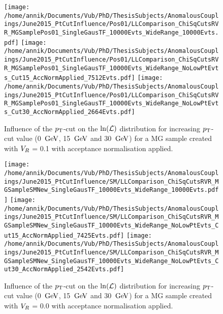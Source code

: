 \begin{figure}[h!t]
 \centering
 \texttt{[image: /home/annik/Documents/Vub/PhD/ThesisSubjects/AnomalousCouplings/June2015\_PtCutInfluence/Pos01/LLComparison\_ChiSqCutsRVR\_MGSamplePos01\_SingleGausTF\_10000Evts\_WideRange\_10000Evts.pdf]}
 \texttt{[image: /home/annik/Documents/Vub/PhD/ThesisSubjects/AnomalousCouplings/June2015\_PtCutInfluence/Pos01/LLComparison\_ChiSqCutsRVR\_MGSamplePos01\_SingleGausTF\_10000Evts\_WideRange\_NoLowPtEvts\_Cut15\_AccNormApplied\_7512Evts.pdf]}
 \texttt{[image: /home/annik/Documents/Vub/PhD/ThesisSubjects/AnomalousCouplings/June2015\_PtCutInfluence/Pos01/LLComparison\_ChiSqCutsRVR\_MGSamplePos01\_SingleGausTF\_10000Evts\_WideRange\_NoLowPtEvts\_Cut30\_AccNormApplied\_2664Evts.pdf]}
 \caption{Influence of the $p_{\textrm T}$-cut on the $\ln(\mathcal{L})$ distribution for increasing $p_{\textrm T}$-cut value (0 $\, \mathrm{GeV}$, 15 $\, \mathrm{GeV}$ and 30 $\, \mathrm{GeV}$) for a MG sample created with $V_{R}$ = 0.1 with acceptance normalisation applied.}
 \label{fig::AccNormPos01}
\end{figure}

\begin{figure}[h!t]
 \centering
 \texttt{[image: /home/annik/Documents/Vub/PhD/ThesisSubjects/AnomalousCouplings/June2015\_PtCutInfluence/SM/LLComparison\_ChiSqCutsRVR\_MGSampleSMNew\_SingleGausTF\_10000Evts\_WideRange\_10000Evts.pdf]}
 \texttt{[image: /home/annik/Documents/Vub/PhD/ThesisSubjects/AnomalousCouplings/June2015\_PtCutInfluence/SM/LLComparison\_ChiSqCutsRVR\_MGSampleSMNew\_SingleGausTF\_10000Evts\_WideRange\_NoLowPtEvts\_Cut15\_AccNormApplied\_7425Evts.pdf]}
 \texttt{[image: /home/annik/Documents/Vub/PhD/ThesisSubjects/AnomalousCouplings/June2015\_PtCutInfluence/SM/LLComparison\_ChiSqCutsRVR\_MGSampleSMNew\_SingleGausTF\_10000Evts\_WideRange\_NoLowPtEvts\_Cut30\_AccNormApplied\_2542Evts.pdf]}
 \caption{Influence of the $p_{\textrm T}$-cut on the $\ln(\mathcal{L})$ distribution for increasing $p_{\textrm T}$-cut value (0 $\, \mathrm{GeV}$, 15 $\, \mathrm{GeV}$ and 30 $\, \mathrm{GeV}$) for a MG sample created with $V_{R}$ = 0.0 with acceptance normalisation applied.}
 \label{fig::AccNormSM}
\end{figure}

